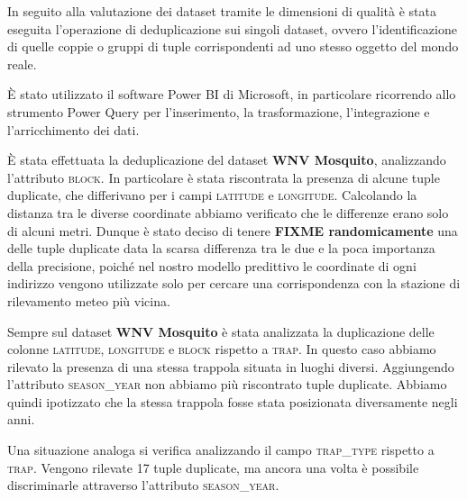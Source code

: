 In seguito alla valutazione dei dataset tramite le dimensioni di qualità è 
stata eseguita l'operazione di deduplicazione sui singoli dataset, ovvero 
l'identificazione di quelle coppie o gruppi di tuple corrispondenti ad uno 
stesso oggetto del mondo reale.

È stato utilizzato il software Power BI di Microsoft, 
in particolare ricorrendo allo strumento Power Query per l'inserimento, la 
trasformazione, l'integrazione e l'arricchimento dei dati.

È stata effettuata la deduplicazione del dataset \textbf{WNV Mosquito}, 
analizzando l'attributo \textsc{block}. In particolare è stata riscontrata 
la presenza di alcune tuple duplicate, che differivano per i campi 
\textsc{latitude} e \textsc{longitude}. Calcolando la distanza tra le diverse 
coordinate abbiamo verificato che le differenze erano solo di alcuni metri.
Dunque è stato deciso di tenere \textbf{FIXME randomicamente} una delle tuple 
duplicate data la scarsa differenza tra le due e la poca importanza della 
precisione, poiché nel nostro modello predittivo le coordinate di ogni 
indirizzo vengono utilizzate solo per cercare una corrispondenza con la 
stazione di rilevamento meteo più vicina.

Sempre sul dataset \textbf{WNV Mosquito} è stata analizzata la duplicazione 
delle colonne \textsc{latitude}, \textsc{longitude} e \textsc{block} rispetto a 
\textsc{trap}. In questo caso abbiamo rilevato la presenza di una stessa 
trappola situata in luoghi diversi. Aggiungendo l'attributo 
\textsc{season\_year} non abbiamo più riscontrato tuple duplicate. Abbiamo 
quindi ipotizzato che la stessa trappola fosse stata posizionata diversamente 
negli anni.

Una situazione analoga si verifica analizzando il campo \textsc{trap\_type} 
rispetto a \textsc{trap}. Vengono rilevate 17 tuple duplicate, ma ancora una 
volta è possibile discriminarle attraverso l'attributo \textsc{season\_year}.
